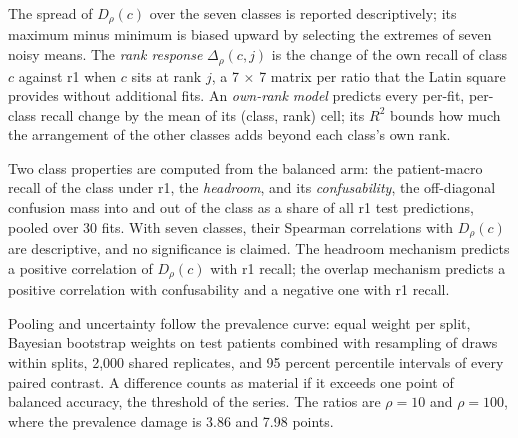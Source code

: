 \documentclass[11pt]{article}
\begin{document}
The spread of $D_\rho(c)$ over the seven classes is reported descriptively; its maximum minus minimum is biased upward by selecting the extremes of seven noisy means. The \emph{rank response} $\Delta_\rho(c,j)$ is the change of the own recall of class $c$ against r1 when $c$ sits at rank $j$, a 7 $\times$ 7 matrix per ratio that the Latin square provides without additional fits. An \emph{own-rank model} predicts every per-fit, per-class recall change by the mean of its (class, rank) cell; its $R^2$ bounds how much the arrangement of the other classes adds beyond each class's own rank.

Two class properties are computed from the balanced arm: the patient-macro recall of the class under r1, the \emph{headroom}, and its \emph{confusability}, the off-diagonal confusion mass into and out of the class as a share of all r1 test predictions, pooled over 30 fits. With seven classes, their Spearman correlations with $D_\rho(c)$ are descriptive, and no significance is claimed. The headroom mechanism predicts a positive correlation of $D_\rho(c)$ with r1 recall; the overlap mechanism predicts a positive correlation with confusability and a negative one with r1 recall.

Pooling and uncertainty follow the prevalence curve: equal weight per split, Bayesian bootstrap weights on test patients \citep{rubin1981bayesian} combined with resampling of draws within splits, 2,000 shared replicates, and 95 percent percentile intervals of every paired contrast. A difference counts as material if it exceeds one point of balanced accuracy, the threshold of the series. The ratios are $\rho=10$ and $\rho=100$, where the prevalence damage is 3.86 and 7.98 points.





\end{document}
